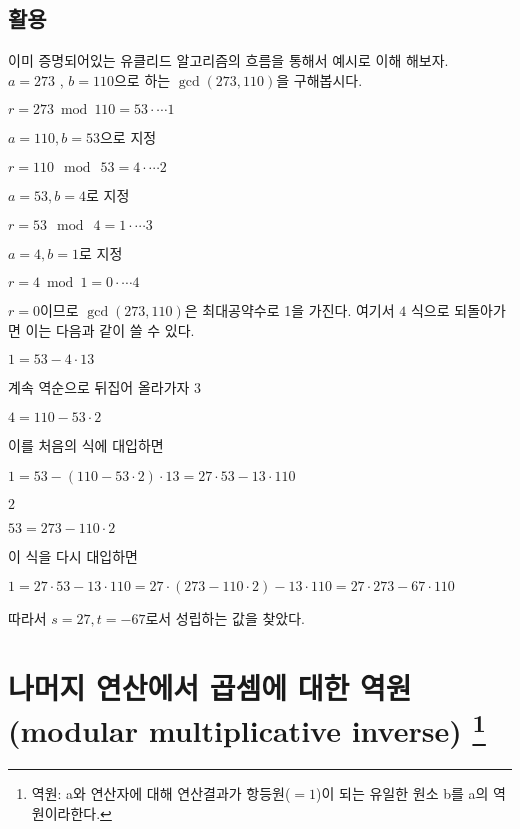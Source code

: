 \documentclass{oblivoir}
\begin{document}
\subsection{활용}
이미 증명되어있는 유클리드 알고리즘의 흐름을 통해서 예시로 이해 해보자.\\
$a=273$  , $b=110$으로 하는 $\gcd(273,110)$을 구해봅시다.
\begin{center}
    $r= 273\bmod  110 = 53 \cdot\cdots \mathit{1}$
\end{center}
$a=110 , b=53$으로 지정
\begin{center}
    $r= 110\:\bmod \: 53 = 4\cdot\cdots \mathit{2}$
\end{center}
$a=53 , b=4$로 지정
\begin{center}
    $r= 53\:\bmod \: 4 = 1 \cdot\cdots \mathit{3}$
\end{center}
$a=4 , b=1$로 지정
\begin{center}
    $r= 4\bmod  1 = 0\cdot\cdots \mathit{4}$
\end{center}
$r=0$이므로 $\gcd(273,110)$은 최대공약수로 1을 가진다.
여기서 $\mathit{4}$ 식으로 되돌아가면 이는 다음과 같이 쓸 수 있다.
\begin{center}
    $1=53 - 4\cdot13$
\end{center}
계속 역순으로 뒤집어 올라가자 $\mathit{3}$
\begin{center}
    $4=110 - 53\cdot2$
\end{center}
이를 처음의 식에 대입하면
\begin{center}
    $1=53 - (110 - 53\cdot2)\cdot13 =27\cdot53-13\cdot110 $
\end{center}
$\mathit{2}$
\begin{center}
    $53=273 - 110\cdot2$
\end{center}
이 식을 다시 대입하면
\begin{center}
    $1=27\cdot53-13\cdot110=27\cdot(273 - 110\cdot2)-13\cdot110=27\cdot273-67\cdot 110$
\end{center}
따라서 $s=27, t=-67$로서 성립하는 값을 찾았다.

\section{나머지 연산에서 곱셈에 대한 역원 (modular multiplicative inverse)
\protect\footnote{역원: a와 연산자에 대해 연산결과가 항등원($=1$)이 되는 유일한 원소 b를 a의 역원이라한다.}} 
\end{document}
